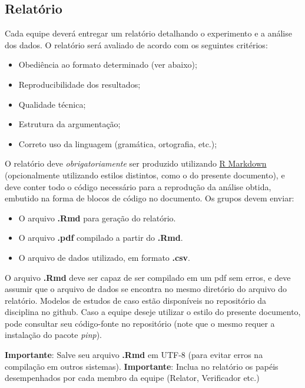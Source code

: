 \documentclass[11pt,twoside,printwatermark=false]{pinp}
\providecommand{\tightlist}{%
  \setlength{\itemsep}{0pt}\setlength{\parskip}{0pt}}
\begin{document}
\subsection{Relatório}\label{relatorio}

Cada equipe deverá entregar um relatório detalhando o experimento e a
análise dos dados. O relatório será avaliado de acordo com os seguintes
critérios:

\begin{itemize}
\tightlist
\item
  Obediência ao formato determinado (ver abaixo);
\item
  Reproducibilidade dos resultados;
\item
  Qualidade técnica;
\item
  Estrutura da argumentação;
\item
  Correto uso da linguagem (gramática, ortografia, etc.);
\end{itemize}

O relatório deve \emph{obrigatoriamente} ser produzido utilizando
\href{http://rmarkdown.rstudio.com}{R Markdown} (opcionalmente
utilizando estilos distintos, como o do presente documento), e deve
conter todo o código necessário para a reprodução da análise obtida,
embutido na forma de blocos de código no documento. Os grupos devem
enviar:

\begin{itemize}
\tightlist
\item
  O arquivo \textbf{.Rmd} para geração do relatório.
\item
  O arquivo \textbf{.pdf} compilado a partir do \textbf{.Rmd}.
\item
  O arquivo de dados utilizado, em formato \textbf{.csv}.
\end{itemize}

O arquivo \textbf{.Rmd} deve ser capaz de ser compilado em um pdf sem
erros, e deve assumir que o arquivo de dados se encontra no mesmo
diretório do arquivo do relatório. Modelos de estudos de caso estão
disponíveis no repositório da disciplina no github. Caso a equipe deseje
utilizar o estilo do presente documento, pode consultar seu código-fonte
no repositório (note que o mesmo requer a instalação do pacote
\emph{pinp}).

\textbf{Importante}: Salve seu arquivo \textbf{.Rmd} em UTF-8 (para
evitar erros na compilação em outros sistemas). \textbf{Importante}:
Inclua no relatório os papéis desempenhados por cada membro da equipe
(Relator, Verificador etc.)
\end{document}
